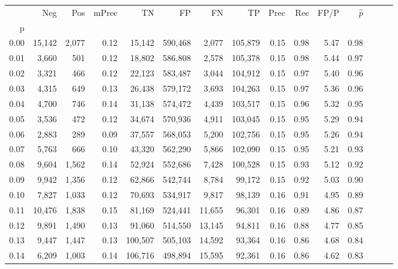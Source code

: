 \begin{tabular}{rrrrrrrrrrrrrrr}
\toprule
{} &     Neg &    Pos & mPrec &       TN &       FP &       FN &       TP &  Prec &   Rec &  FP/P & $\hat{p}$ \\
p    &         &        &       &          &          &          &          &       &       &       &           \\
\midrule
0.00 &  15,142 &  2,077 &  0.12 &   15,142 &  590,468 &    2,077 &  105,879 &  0.15 &  0.98 &  5.47 &      0.98 \\
0.01 &   3,660 &    501 &  0.12 &   18,802 &  586,808 &    2,578 &  105,378 &  0.15 &  0.98 &  5.44 &      0.97 \\
0.02 &   3,321 &    466 &  0.12 &   22,123 &  583,487 &    3,044 &  104,912 &  0.15 &  0.97 &  5.40 &      0.96 \\
0.03 &   4,315 &    649 &  0.13 &   26,438 &  579,172 &    3,693 &  104,263 &  0.15 &  0.97 &  5.36 &      0.96 \\
0.04 &   4,700 &    746 &  0.14 &   31,138 &  574,472 &    4,439 &  103,517 &  0.15 &  0.96 &  5.32 &      0.95 \\
0.05 &   3,536 &    472 &  0.12 &   34,674 &  570,936 &    4,911 &  103,045 &  0.15 &  0.95 &  5.29 &      0.94 \\
0.06 &   2,883 &    289 &  0.09 &   37,557 &  568,053 &    5,200 &  102,756 &  0.15 &  0.95 &  5.26 &      0.94 \\
0.07 &   5,763 &    666 &  0.10 &   43,320 &  562,290 &    5,866 &  102,090 &  0.15 &  0.95 &  5.21 &      0.93 \\
0.08 &   9,604 &  1,562 &  0.14 &   52,924 &  552,686 &    7,428 &  100,528 &  0.15 &  0.93 &  5.12 &      0.92 \\
0.09 &   9,942 &  1,356 &  0.12 &   62,866 &  542,744 &    8,784 &   99,172 &  0.15 &  0.92 &  5.03 &      0.90 \\
0.10 &   7,827 &  1,033 &  0.12 &   70,693 &  534,917 &    9,817 &   98,139 &  0.16 &  0.91 &  4.95 &      0.89 \\
0.11 &  10,476 &  1,838 &  0.15 &   81,169 &  524,441 &   11,655 &   96,301 &  0.16 &  0.89 &  4.86 &      0.87 \\
0.12 &   9,891 &  1,490 &  0.13 &   91,060 &  514,550 &   13,145 &   94,811 &  0.16 &  0.88 &  4.77 &      0.85 \\
0.13 &   9,447 &  1,447 &  0.13 &  100,507 &  505,103 &   14,592 &   93,364 &  0.16 &  0.86 &  4.68 &      0.84 \\
0.14 &   6,209 &  1,003 &  0.14 &  106,716 &  498,894 &   15,595 &   92,361 &  0.16 &  0.86 &  4.62 &      0.83 \\

\end{tabular}
